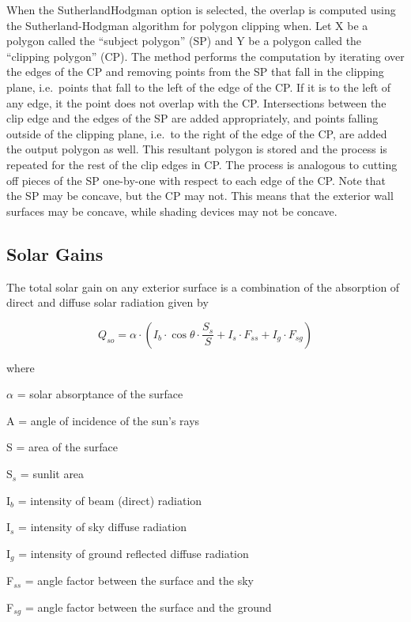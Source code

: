 When the SutherlandHodgman option is selected, the overlap is computed using the Sutherland-Hodgman algorithm for polygon clipping when. Let X be a polygon called the ``subject polygon'' (SP) and Y be a polygon called the ``clipping polygon'' (CP). The method performs the computation by iterating over the edges of the CP and removing points from the SP that fall in the clipping plane, i.e.~points that fall to the left of the edge of the CP. If it is to the left of any edge, it the point does not overlap with the CP. Intersections between the clip edge and the edges of the SP are added appropriately, and points falling outside of the clipping plane, i.e.~to the right of the edge of the CP, are added the output polygon as well. This resultant polygon is stored and the process is repeated for the rest of the clip edges in CP. The process is analogous to cutting off pieces of the SP one-by-one with respect to each edge of the CP. Note that the SP may be concave, but the CP may not. This means that the exterior wall surfaces may be concave, while shading devices may not be concave.

\subsection{Solar Gains}\label{solar-gains-000}

The total solar gain on any exterior surface is a combination of the absorption of direct and diffuse solar radiation given by

\begin{equation}
{Q_{so}} = \alpha \cdot \left( {{I_b}\cdot \cos \theta \cdot \frac{{{S_s}}}{S} + {I_s}\cdot {F_{ss}} + {I_g}\cdot {F_{sg}}} \right)
\end{equation}

where

$\alpha$ = solar absorptance of the surface

A = angle of incidence of the sun's rays

S = area of the surface

S\(_{s}\) = sunlit area

I\(_{b}\) = intensity of beam (direct) radiation

I\(_{s}\) = intensity of sky diffuse radiation

I\(_{g}\) = intensity of ground reflected diffuse radiation

F\(_{ss}\) = angle factor between the surface and the sky

F\(_{sg}\) = angle factor between the surface and the ground


